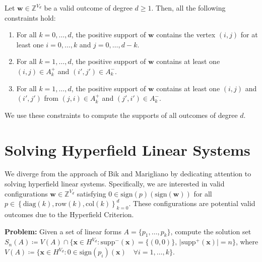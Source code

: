 \begin{corollary}\label{cor:sdnfksjnjkwnrw3r}
    Let \( \mathbf{w} \in \mathbb{Z}^{V_d} \) be a valid outcome of degree \( d \geq 1 \). Then, all the following constraints hold:
    \begin{enumerate}
        \item For all \( k = 0, \dots, d \), the positive support of \( \mathbf{w} \) contains the vertex \( (i,j) \) for at least one \( i = 0, \dots, k \) and \( j = 0, \dots, d - k \).
        \item For all \( k = 1, \dots, d \), the positive support of \( \mathbf{w} \) contains at least one \( (i,j) \in A_k^+ \) and \( (i',j') \in A_k^- \).
        \item For all \( k = 1, \dots, d \), the positive support of \( \mathbf{w} \) contains at least one \( (i,j) \) and \( (i',j') \) from \( (j,i) \in A_k^+ \) and \( (j',i') \in A_k^- \).
    \end{enumerate}
\end{corollary}

We use these constraints to compute the supports of all outcomes of degree \( d \).

\section{Solving Hyperfield Linear Systems}

We diverge from the approach of Bik and Marigliano by dedicating attention to solving hyperfield linear systems. Specifically, we are interested in valid configurations \( \mathbf{w} \in \mathbb{Z}^{V_d} \) satisfying \( 0 \in \mathrm{sign}(p)(\mathrm{sign}(\mathbf{w})) \)
for all \( p \in \left\{ \mathrm{diag}(k), \mathrm{row}(k), \mathrm{col}(k) \right\}_{k=0}^d \). These configurations are potential valid outcomes due to the Hyperfield Criterion.

\vspace{0.3cm}

\noindent \textbf{Problem:} Given a set of linear forms $A = \{ p_{1}, \dots, p_{k} \}$, compute the solution set $S_{n}(A) \coloneqq V(A) \cap \{ \mathbf{x} \in H^{V_{d}} : \text{$\mathrm{supp}^-(\mathbf{x}) = \{ (0,0) \}$, $\vert \mathrm{supp}^+(\mathbf{x}) \vert = n$} \}$, where $V(A) \coloneqq \{ \mathbf{x} \in H^{V_{d}} : 0 \in \mathrm{sign}(p_{i})(\mathbf{x})  \quad \forall i = 1, \dots, k \}$.

\vspace{0.3cm}

